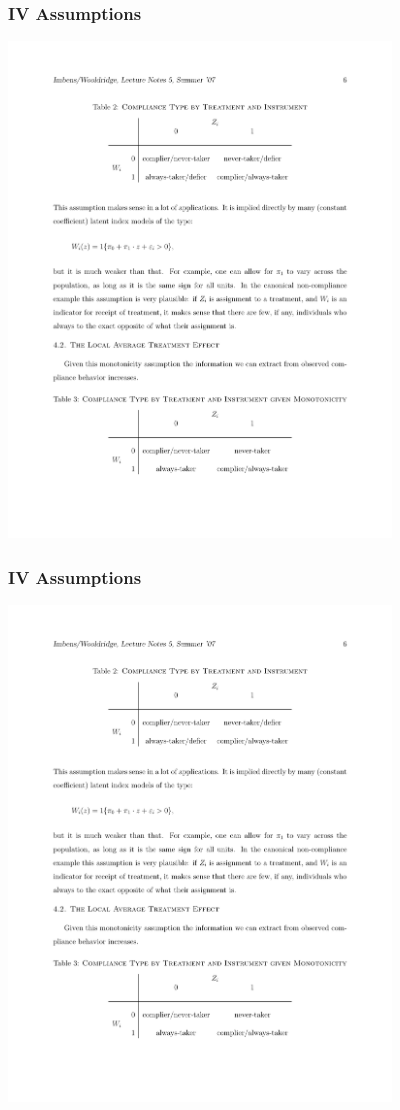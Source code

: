 \documentclass[xcolor=pdftex,dvipsnames,table,mathserif]{beamer}
\begin{document}
\begin{frame}
\frametitle{IV Assumptions}
\includegraphics[width=4in]{./resources/imbens2.pdf}
\end{frame}

\begin{frame}
\frametitle{IV Assumptions}
\includegraphics[width=4in]{./resources/imbens3.pdf}
\end{frame}
\end{document}
